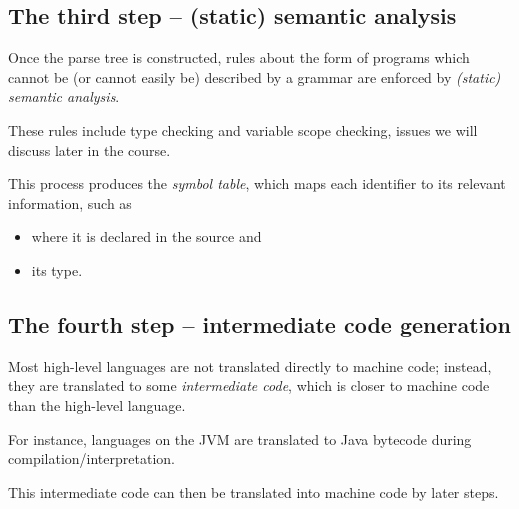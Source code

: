 \documentclass[11pt]{article}
\theoremstyle{definition}
\begin{document}
\subsection{The third step – (static) semantic analysis}
\label{sec:orgc9121d5}
Once the parse tree is constructed,
rules about the form of programs
which cannot be (or cannot easily be)
described by a grammar are enforced
by \emph{(static) semantic analysis}.

These rules include type checking and variable scope checking,
issues we will discuss later in the course.

This process produces the \emph{symbol table}, which maps
each identifier to its relevant information,
such as
\begin{itemize}
\item where it is declared in the source and
\item its type.
\end{itemize}

\subsection{The fourth step – intermediate code generation}
\label{sec:orgba3ffcd}
Most high-level languages are not translated directly to machine code;
instead, they are translated to some \emph{intermediate code},
which is closer to machine code than the high-level language.

For instance, languages on the JVM are translated
to Java bytecode during compilation/interpretation.

This intermediate code can then be translated
into machine code by later steps.
\end{document}
